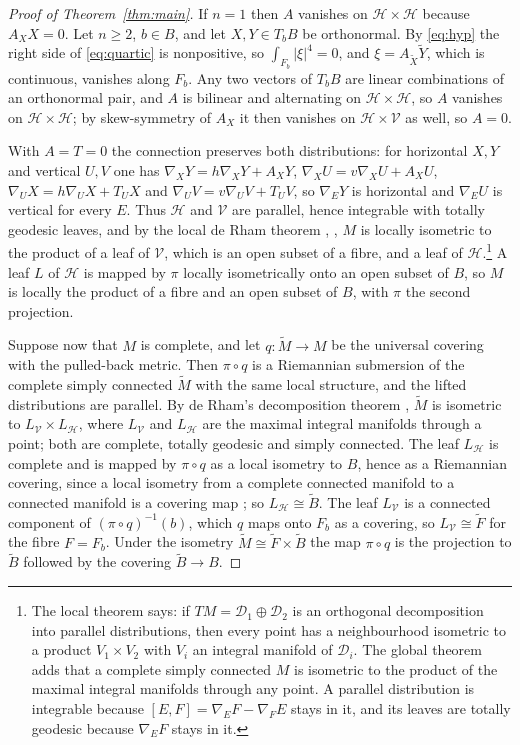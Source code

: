 \documentclass[11pt,reqno]{amsart}
\theoremstyle{plain}
\theoremstyle{definition}
\newcommand{\hor}{\mathcal{H}}
\newcommand{\ver}{\mathcal{V}}
\newcommand{\bas}[1]{\widetilde{#1}}
\begin{document}
\begin{proof}[Proof of Theorem~\ref{thm:main}]
If $n=1$ then $A$ vanishes on $\hor\times\hor$ because $A_XX=0$. Let $n\ge2$, $b\in B$, and let $X,Y\in T_bB$ be orthonormal. By \eqref{eq:hyp} the right side of \eqref{eq:quartic} is nonpositive, so $\int_{F_b}|\xi|^4=0$, and $\xi=A_{\bas X}\bas Y$, which is continuous, vanishes along $F_b$. Any two vectors of $T_bB$ are linear combinations of an orthonormal pair, and $A$ is bilinear and alternating on $\hor\times\hor$, so $A$ vanishes on $\hor\times\hor$; by skew-symmetry of $A_X$ it then vanishes on $\hor\times\ver$ as well, so $A=0$.

With $A=T=0$ the connection preserves both distributions: for horizontal $X,Y$ and vertical $U,V$ one has $\nabla_XY=h\nabla_XY+A_XY$, $\nabla_XU=v\nabla_XU+A_XU$, $\nabla_UX=h\nabla_UX+T_UX$ and $\nabla_UV=v\nabla_UV+T_UV$, so $\nabla_EY$ is horizontal and $\nabla_EU$ is vertical for every $E$. Thus $\hor$ and $\ver$ are parallel, hence integrable with totally geodesic leaves, and by the local de Rham theorem \cite{deRham1952}, \cite[Chapter IV, Proposition 5.2]{KobayashiNomizu1963}, $M$ is locally isometric to the product of a leaf of $\ver$, which is an open subset of a fibre, and a leaf of $\hor$.\footnote{The local theorem says: if $TM=\mathcal D_1\oplus\mathcal D_2$ is an orthogonal decomposition into parallel distributions, then every point has a neighbourhood isometric to a product $V_1\times V_2$ with $V_i$ an integral manifold of $\mathcal D_i$. The global theorem adds that a complete simply connected $M$ is isometric to the product of the maximal integral manifolds through any point. A parallel distribution is integrable because $[E,F]=\nabla_EF-\nabla_FE$ stays in it, and its leaves are totally geodesic because $\nabla_EF$ stays in it.} A leaf $L$ of $\hor$ is mapped by $\pi$ locally isometrically onto an open subset of $B$, so $M$ is locally the product of a fibre and an open subset of $B$, with $\pi$ the second projection.

Suppose now that $M$ is complete, and let $q\colon\bas M\to M$ be the universal covering with the pulled-back metric. Then $\pi\circ q$ is a Riemannian submersion of the complete simply connected $\bas M$ with the same local structure, and the lifted distributions are parallel. By de Rham's decomposition theorem \cite{deRham1952}, $\bas M$ is isometric to $L_{\ver}\times L_{\hor}$, where $L_{\ver}$ and $L_{\hor}$ are the maximal integral manifolds through a point; both are complete, totally geodesic and simply connected. The leaf $L_{\hor}$ is complete and is mapped by $\pi\circ q$ as a local isometry to $B$, hence as a Riemannian covering, since a local isometry from a complete connected manifold to a connected manifold is a covering map \cite[Chapter IV, Theorem 4.6]{KobayashiNomizu1963}; so $L_{\hor}\cong\bas B$. The leaf $L_{\ver}$ is a connected component of $(\pi\circ q)^{-1}(b)$, which $q$ maps onto $F_b$ as a covering, so $L_{\ver}\cong\bas F$ for the fibre $F=F_b$. Under the isometry $\bas M\cong\bas F\times\bas B$ the map $\pi\circ q$ is the projection to $\bas B$ followed by the covering $\bas B\to B$.
\end{proof}
\end{document}
